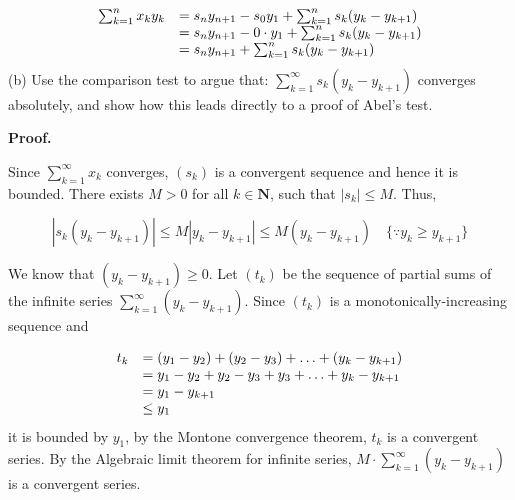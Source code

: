 \documentclass[10pt]{article}
\begin{document}
\begin{equation*}
\begin{array}{ c l }
\sum _{k=1}^{n} x_{k} y_{k} & =s_{n} y_{n+1} -s_{0} y_{1} +\sum _{k=1}^{n} s_{k}( y_{k} -y_{k+1})\\
 & =s_{n} y_{n+1} -0\cdot y_{1} +\sum _{k=1}^{n} s_{k}( y_{k} -y_{k+1})\\
 & =s_{n} y_{n+1} +\sum _{k=1}^{n} s_{k}( y_{k} -y_{k+1})
\end{array}
\end{equation*}
(b) Use the comparison test to argue that: $\displaystyle \sum _{k=1}^{\infty } s_{k}( y_{k} -y_{k+1})$ converges absolutely, and show how this leads directly to a proof of Abel's test. 



\textbf{Proof.}



Since $\displaystyle \sum _{k=1}^{\infty } x_{k}$ converges, $\displaystyle ( s_{k})$ is a convergent sequence and hence it is bounded. There exists $\displaystyle M >0$ for all $\displaystyle k\in \mathbf{N}$, such that $\displaystyle |s_{k} |\leq M$. Thus,


\begin{equation*}
|s_{k}( y_{k} -y_{k+1}) |\leq M|y_{k} -y_{k+1} |\leq M( y_{k} -y_{k+1}) \quad \{\because y_{k} \geq y_{k+1}\}
\end{equation*}


We know that $\displaystyle ( y_{k} -y_{k+1}) \geq 0$. Let $\displaystyle ( t_{k})$ be the sequence of partial sums of the infinite series $\displaystyle \sum _{k=1}^{\infty }( y_{k} -y_{k+1})$. Since $\displaystyle ( t_{k})$ is a monotonically-increasing sequence and 


\begin{equation*}
\begin{array}{ c l }
t_{k} & =( y_{1} -y_{2}) +( y_{2} -y_{3}) +\dotsc +( y_{k} -y_{k+1})\\
 & =y_{1} -y_{2} +y_{2} -y_{3} +y_{3} +\dotsc +y_{k} -y_{k+1}\\
 & =y_{1} -y_{k+1}\\
 & \leq y_{1}
\end{array}
\end{equation*}
it is bounded by $\displaystyle y_{1}$, by the Montone convergence theorem, $\displaystyle t_{k}$ is a convergent series. By the Algebraic limit theorem for infinite series, $\displaystyle M\cdot \sum _{k=1}^{\infty }( y_{k} -y_{k+1})$ is a convergent series.
\end{document}
